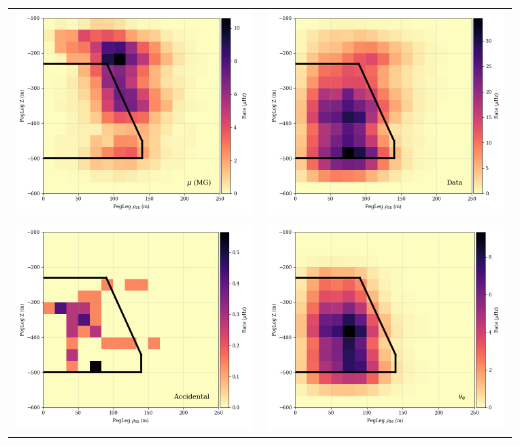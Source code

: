 \begin{center}
\begin{table}
\begin{tabular}{cc}
    \includegraphics[width=0.45\linewidth]{pegleg_z_rho_muongun.png} &  
    \includegraphics[width=0.45\linewidth]{pegleg_z_rho_data.png} \\  

    \includegraphics[width=0.45\linewidth]{pegleg_z_rho_noise.png} &  
    \includegraphics[width=0.45\linewidth]{pegleg_z_rho_genie_nue.png} \\  


\end{tabular}
\end{table}
\end{center}
